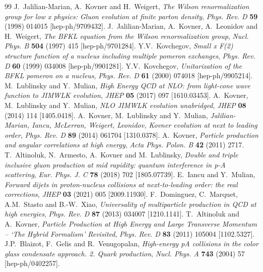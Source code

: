 \begin{thebibliography}{99}
 J.~Jalilian-Marian, A.~Kovner and H.~Weigert, \emph{The Wilson renormalization group for low x physics: Gluon evolution at finite parton density}, \emph{Phys. Rev. D} \textbf{59} (1998) 014015 [hep-ph/9709432].
 J.~Jalilian-Marian, A.~Kovner, A.~Leonidov and H.~Weigert, \emph{The BFKL equation from the Wilson renormalization group}, \emph{Nucl. Phys. B} \textbf{504} (1997) 415 [hep-ph/9701284].
 Y.V.~Kovchegov, \emph{Small x F(2) structure function of a nucleus including multiple pomeron exchanges}, \emph{Phys. Rev. D} \textbf{60} (1999) 034008 [hep-ph/9901281].
 Y.V.~Kovchegov, \emph{Unitarization of the BFKL pomeron on a nucleus}, \emph{Phys. Rev. D} \textbf{61} (2000) 074018 [hep-ph/9905214].
 M.~Lublinsky and Y.~Mulian, \emph{High Energy QCD at NLO: from light-cone wave function to JIMWLK evolution}, \emph{JHEP} \textbf{05} (2017) 097 [1610.03453].
 A.~Kovner, M.~Lublinsky and Y.~Mulian, \emph{NLO JIMWLK evolution unabridged}, \emph{JHEP} \textbf{08} (2014) 114 [1405.0418].
 A.~Kovner, M.~Lublinsky and Y.~Mulian, \emph{Jalilian-Marian, Iancu, McLerran, Weigert, Leonidov, Kovner evolution at next to leading order}, \emph{Phys. Rev. D} \textbf{89} (2014) 061704 [1310.0378].
 A.~Kovner, \emph{Particle production and angular correlations at high energy}, \emph{Acta Phys. Polon. B} \textbf{42} (2011) 2717.
 T.~Altinoluk, N.~Armesto, A.~Kovner and M.~Lublinsky, \emph{Double and triple inclusive gluon production at mid rapidity: quantum interference in p-A scattering}, \emph{Eur. Phys. J. C} \textbf{78} (2018) 702 [1805.07739].
 E.~Iancu and Y.~Mulian, \emph{Forward dijets in proton-nucleus collisions at next-to-leading order: the real corrections}, \emph{JHEP} \textbf{03} (2021) 005 [2009.11930].
 F.~Dominguez, C.~Marquet, A.M.~Stasto and B.-W.~Xiao, \emph{Universality of multiparticle production in QCD at high energies}, \emph{Phys. Rev. D} \textbf{87} (2013) 034007 [1210.1141].
 T.~Altinoluk and A.~Kovner, \emph{Particle Production at High Energy and Large Transverse Momentum -- `The Hybrid Formalism' Revisited}, \emph{Phys. Rev. D} \textbf{83} (2011) 105004 [1102.5327].
 J.P.~Blaizot, F.~Gelis and R.~Venugopalan, \emph{High-energy pA collisions in the color glass condensate approach. 2. Quark production}, \emph{Nucl. Phys. A} \textbf{743} (2004) 57 [hep-ph/0402257].

\end{thebibliography}
